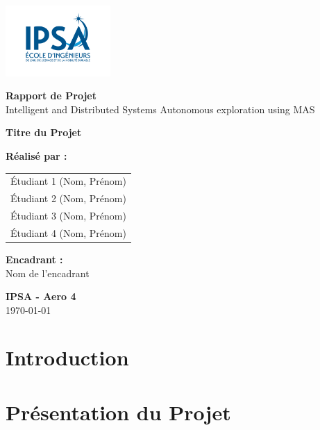\documentclass[a4paper,12pt]{report}
\begin{document}
\begin{titlepage}
    \centering
    \vspace*{1cm}
    \includegraphics[width=0.3\textwidth]{assets/ipsa_logo.png}
    \vspace{1cm}
    
    \Huge\textbf{Rapport de Projet}\\
    \vspace{0.5cm}
    \LARGE Intelligent and Distributed Systems Autonomous exploration using MAS\\
    \vspace{2cm}
    
    \Large\textbf{Titre du Projet}\\
    \vspace{1cm}
    
    \textbf{Réalisé par :}\\
    \vspace{0.5cm}
    \begin{tabular}{l}
        Étudiant 1 (Nom, Prénom) \\
        Étudiant 2 (Nom, Prénom) \\
        Étudiant 3 (Nom, Prénom) \\
        Étudiant 4 (Nom, Prénom) \\
    \end{tabular}
    \vspace{2cm}
    
    \textbf{Encadrant :}\\
    Nom de l'encadrant\\
    \vfill
    
    \textbf{IPSA - Aero 4}\\
    \today
\end{titlepage}

\tableofcontents
\newpage

\section{Introduction}


\section{Présentation du Projet}

\end{document}

